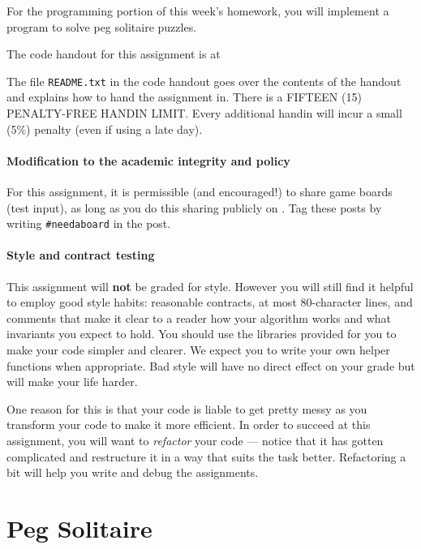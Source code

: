 \documentclass[12pt]{exam}
\begin{document}
\hwTitle

\noindent
For the programming portion of this week's homework, you will
implement a program to solve peg solitaire puzzles.


\bigskip
\noindent
The code handout for this assignment is at
\begin{center}
\end{center}
The file \lstinline'README.txt' in the code handout goes over the
contents of the handout and explains how to hand the assignment in.
There is a FIFTEEN (15) PENALTY-FREE HANDIN LIMIT.  Every additional
handin will incur a small (5\%) penalty (even if
using a late day).


\paragraph{Modification to the academic integrity and \qatoolName{} policy}

For this assignment, it is permissible (and encouraged!) to share game
boards (test input), as long as you do this sharing publicly on
\qatool{}.  Tag these \qatoolName{} posts by writing
\lstinline'#needaboard' in the post.

\paragraph{Style and contract testing}

This assignment will \textbf{not} be graded for style.  However you
will still find it helpful to employ good style habits: reasonable
contracts, at most 80-character lines, and comments that make it clear
to a reader how your algorithm works and what invariants you expect to
hold. You should use the libraries provided for you to make your code
simpler and clearer. We expect you to write your own helper functions
when appropriate.  Bad style will have no direct effect on your grade
but will make your life harder.

One reason for this is that your code is liable to get pretty messy as
you transform your code to make it more efficient. In order to succeed
at this assignment, you will want to \emph{refactor} your code ---
notice that it has gotten complicated and restructure it in a way that
suits the task better. Refactoring a bit will help you write and debug
the assignments.


\newpage
\section*{Peg Solitaire}
\label{sec:peg}
\end{document}
